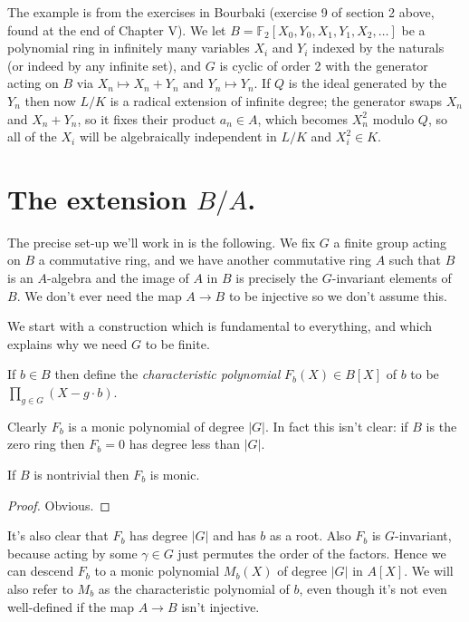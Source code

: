 The example is from the exercises in Bourbaki (exercise 9 of section 2 above, found at the end
of Chapter V). We let $B=\mathbb{F}_2[X_0,Y_0,X_1,Y_1,X_2,\ldots]$
be a polynomial ring in infinitely many variables $X_i$ and $Y_i$ indexed by the
naturals (or indeed by any infinite set), and $G$ is cyclic of order 2 with
the generator acting on $B$ via $X_n\mapsto X_n+Y_n$ and $Y_n\mapsto Y_n$.
If $Q$ is the ideal generated by the $Y_n$ then now $L/K$ is a radical extension of
infinite degree; the generator swaps $X_n$ and $X_n+Y_n$, so it fixes
their product $a_n\in A$, which becomes $X_n^2$ modulo $Q$, so all
of the $X_{i}$ will be algebraically independent in $L/K$ and $X_{i}^2\in K$.

\section{The extension \texorpdfstring{$B/A$}{B/A}.}

The precise set-up we'll work in is the following. We fix $G$ a finite group acting
on $B$ a commutative ring, and we have another commutative ring $A$ such
that $B$ is an $A$-algebra and the image of $A$ in $B$ is precisely the $G$-invariant
elements of $B$. We don't ever need the map $A\to B$ to be injective so we don't assume this.

We start with a construction which is fundamental to everything,
and which explains why we need $G$ to be finite.

\begin{definition}
  \label{MulSemiringAction.CharacteristicPolynomial.F}
  \leanok
  If $b\in B$ then define the \emph{characteristic polynomial}
  $F_b(X) \in B[X]$ of $b$ to be $\prod_{g\in G}(X-g\cdot b)$.
\end{definition}

Clearly $F_b$ is a monic polynomial of degree $|G|$. In fact this isn't clear:
if $B$ is the zero ring then $F_b=0$ has degree less than $|G|$.

\begin{lemma}
  \label{MulSemiringAction.CharacteristicPolynomial.F_degree}
  \leanok
  If $B$ is nontrivial then $F_b$ is monic.
\end{lemma}
\begin{proof}
  \leanok
  Obvious.
\end{proof}

It's also clear that $F_b$ has degree $|G|$ and has $b$ as a root.
Also $F_b$ is $G$-invariant, because acting by some $\gamma\in G$
just permutes the order of the factors. Hence we can descend $F_b$
to a monic polynomial $M_b(X)$ of degree $|G|$ in $A[X]$. We will
also refer to $M_b$ as the characteristic polynomial of $b$, even though
it's not even well-defined if the map $A\to B$ isn't injective.


